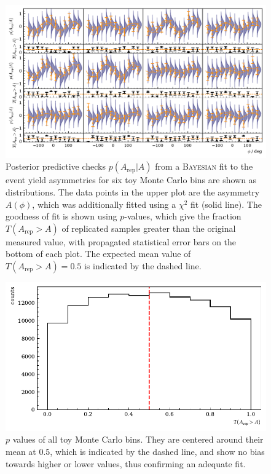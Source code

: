 	\begin{figure}
		\centering
		\includegraphics[width=\linewidth]{../bayes/toyMC/plots/toyMC_ppd_checks.pdf}
		\caption{Posterior predictive checks $p\left(A_\text{rep}\big|A\right)$ from a \textsc{Bayesian} fit to the event yield asymmetries for six toy Monte Carlo bins are shown as distributions. The data points in the upper plot are the asymmetry $A\left(\phi\right)$, which was additionally fitted using a $\chi^2$ fit (solid line). The goodness of fit is shown using $p$-values, which give the fraction $T\left(A_\text{rep}>A\right)$ of replicated samples greater than the original measured value, with propagated statistical error bars on the bottom of each plot. The expected mean value of $T\left(A_\text{rep}>A\right)=0.5$ is indicated by the dashed line. }
		\label{fig:toymc_asym}
	\end{figure}




\begin{figure}[htbp]
	\centering
	\includegraphics[width=\linewidth]{../bayes/toyMC/plots/toyMC_pval_hist.pdf}
	\caption{$p$ values of all toy Monte Carlo bins. They are centered around their mean at $0.5$, which is indicated by the dashed line, and show no bias towards higher or lower values, thus confirming an adequate fit.}
	\label{fig:toymc_pvals}
\end{figure}

